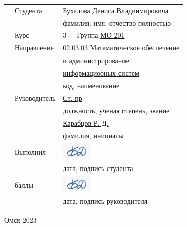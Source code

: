 \documentclass[a4paper,12pt]{article}
\begin{document}
\begin{center}
\vspace*{20mm}
\begin{tabular}{lll}
\hspace*{40mm}&Студента	  &\underline{Бухалова Дениса Владиимировича \hspace*{11mm}}\\
              & &	{\footnotesize фамилия, имя, отчество полностью}\\
&Курс	&3\ \ \ Группа	\underline{МО-201\hspace*{44mm}}\\
&Направление  	& \underline{02.03.03 Математическое обеспечение\hspace*{9mm}}\\
&& \underline{и администрирование\hspace*{39mm}}\\
&& \underline{информациооных систем\hspace*{33mm}} \\
	&&{\footnotesize код, наименование}\\
&Руководитель	    & \underline{Ст. пр \hspace*{67mm}}\\
&&{\footnotesize	должность, ученая степень, звание}\\
	       && \underline{Карабцов Р. Д. \hspace*{50mm}}\\
	&& {\footnotesize фамилия, инициалы}\\
&Выполнил&  \underline{\includegraphics[height=8mm, width=15mm]{fake_pod.png} {\hspace*{65mm}}}  \\	
&& {\footnotesize дата, подпись студента}\\
&баллы&\underline{\includegraphics[height=8mm, width=15mm]{fake_pod.png} {\hspace*{65mm}}}\\
&& {\footnotesize дата, подпись руководителя}
\end{tabular}

\vspace*{10mm}
Омск 2023
\end{center}
\end{document}
